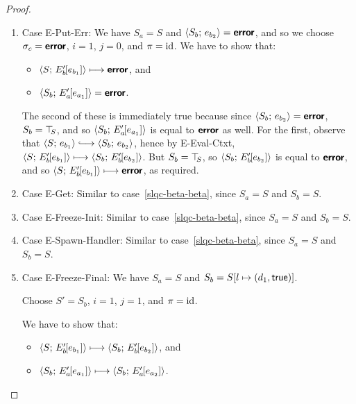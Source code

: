 \begin{proof}
\begin{enumerate}
\begin{enumerate}
    \item \label{slqc-beta-put-err}Case {\sc E-Put-Err}: We have $S_a
      = S$ and $\langle S_b;\, e_{b_2} \rangle = \textbf{\textsf{error}}$, and so we choose
      $\sigma_c = \textbf{\textsf{error}}$, $i = 1$, $j = 0$, and $\pi = \mathrm{id}$.  We have
      to show that:
      \begin{itemize}
      \item $\langle S;\, E'_b\hspace{-1mm}\left[e_{b_1}\right] \rangle \longmapsto \textbf{\textsf{error}}$,
        and
      \item
        $\langle S_b;\, E'_a\hspace{-1mm}\left[e_{a_1}\right] \rangle = \textbf{\textsf{error}}$.
      \end{itemize}

      The second of these is immediately true because since
      $\langle S_b;\, e_{b_2} \rangle = \textbf{\textsf{error}}$, $S_b = \top\hspace{-0.85mm}_{S}$, and so
      $\langle S_b;\, E'_a\hspace{-1mm}\left[e_{a_1}\right] \rangle$ is equal to $\textbf{\textsf{error}}$ as
      well.  For the first, observe that $\config{S}{e_{b_1}}
      \parstepsto \config{S_b}{e_{b_2}}$, hence by {\sc E-Eval-Ctxt},
      $\langle S;\, E'_b\hspace{-1mm}\left[e_{b_1}\right] \rangle \longmapsto
      \langle S_b;\, E'_b\hspace{-1mm}\left[e_{b_2}\right] \rangle$.  But $S_b = \top\hspace{-0.85mm}_{S}$, so
      $\langle S_b;\, E'_b\hspace{-1mm}\left[e_{b_2}\right] \rangle$ is equal to $\textbf{\textsf{error}}$,
      and so $\langle S;\, E'_b\hspace{-1mm}\left[e_{b_1}\right] \rangle \longmapsto
      \textbf{\textsf{error}}$, as required.

    \item \label{slqc-beta-get}Case {\sc E-Get}: Similar to
      case~\ref{slqc-beta-beta}, since $S_a = S$ and $S_b = S$.
    \item \label{slqc-beta-freeze-init}Case {\sc E-Freeze-Init}:
      Similar to case~\ref{slqc-beta-beta}, since $S_a = S$ and $S_b =
      S$.
    \item \label{slqc-beta-spawn-handler}Case {\sc E-Spawn-Handler}:
      Similar to case~\ref{slqc-beta-beta}, since $S_a = S$ and $S_b =
      S$.
    \item \label{slqc-beta-freeze-final}Case {\sc E-Freeze-Final}: We
      have $S_a = S$ and $S_b = S[l \mapsto (d_1, \textsf{true})]$.

      Choose $S' = S_b$, $i = 1$, $j = 1$, and $\pi = \mathrm{id}$.

      We have to show that:
      \begin{itemize}
      \item $\langle S;\, E'_b\hspace{-1mm}\left[e_{b_1}\right] \rangle \longmapsto
        \langle S_b;\, E'_b\hspace{-1mm}\left[e_{b_2}\right] \rangle$, and
      \item
        $\langle S_b;\, E'_a\hspace{-1mm}\left[e_{a_1}\right] \rangle \longmapsto
        \langle S_b;\, E'_a\hspace{-1mm}\left[e_{a_2}\right] \rangle$.
      \end{itemize}


\end{enumerate}
\end{enumerate}
\end{proof}
